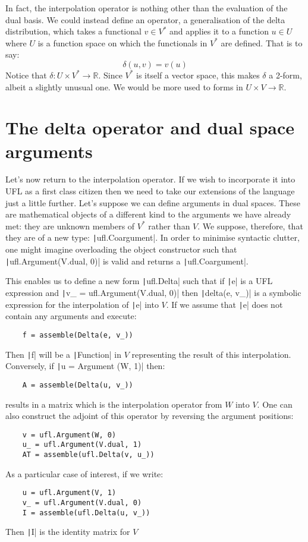 \documentclass[a4paper,11pt]{article}
\begin{document}
In fact, the interpolation operator is nothing other than the evaluation of the dual basis. We could instead define an operator, a generalisation of the delta distribution, which takes a functional $v\in V^*$ and applies it to a function $u\in U$ where $U$ is a function space on which the functionals in $V^*$ are defined. That is to say:
\begin{equation}
    \delta(u, v) = v(u)
\end{equation}
Notice that $\delta: U\times V^*\rightarrow \mathbb{R}$. Since $V^*$ is itself a vector space, this makes $\delta$ a 2-form, albeit a slightly unusual one. We would be more used to forms in $U\times V\rightarrow\mathbb{R}$.



\section{The delta operator and dual space arguments}

Let's now return to the interpolation operator. If we wish to incorporate it into UFL as a first class citizen then we need to take our extensions of the language just a little further. Let's suppose we can define arguments in dual spaces. These are mathematical objects of a different kind to the arguments we have already met: they are unknown members of $V^*$ rather than $V$. We suppose, therefore, that they are of a new type: \texttt|ufl.Coargument|. In order to minimise syntactic clutter, one might imagine overloading the object constructor such that \texttt|ufl.Argument(V.dual, 0)| is valid and returns a \texttt|ufl.Coargument|.

This enables us to define a new form \texttt|ufl.Delta| such that if \texttt|e| is a UFL expression and \texttt|v_ = ufl.Argument(V.dual, 0)| then \texttt|delta(e, v_)| is a symbolic expression for the interpolation of \texttt|e| into $V$. If we assume that \texttt|e| does not contain any arguments and execute:
\begin{verbatim}
    f = assemble(Delta(e, v_))
\end{verbatim}
Then \texttt|f| will be a \texttt|Function| in $V$ representing the result of this interpolation. Conversely, if \texttt|u = Argument (W, 1)| then:
\begin{verbatim}
    A = assemble(Delta(u, v_))
\end{verbatim}
results in a matrix which is the interpolation operator from $W$ into $V$. One can also construct the adjoint of this operator by reversing the argument positions:
\begin{verbatim}
    v = ufl.Argument(W, 0)
    u_ = ufl.Argument(V.dual, 1)
    AT = assemble(ufl.Delta(v, u_))
\end{verbatim}
As a particular case of interest, if we write:
\begin{verbatim}
    u = ufl.Argument(V, 1)
    v_ = ufl.Argument(V.dual, 0)
    I = assemble(ufl.Delta(u, v_))
\end{verbatim}
Then \texttt|I| is the identity matrix for $V$
\end{document}
